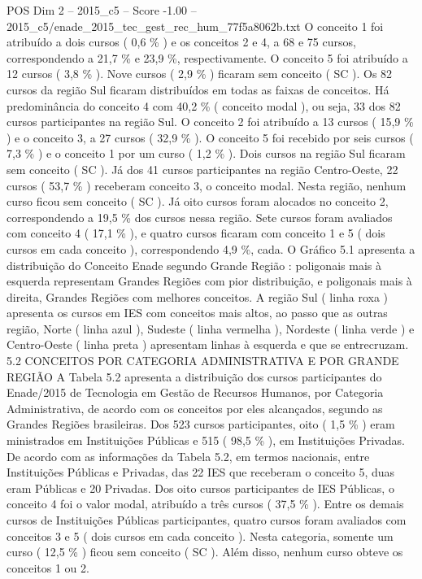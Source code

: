 \begin{textsample}{POS Dim 2 – 2015\_c5 – Score -1.00 – 2015\_c5/enade\_2015\_tec\_gest\_rec\_hum\_77f5a8062b.txt}
O conceito 1 foi atribuído a dois cursos ( 0,6 \% ) e os conceitos 2 e 4, a 68 e 75 cursos, correspondendo a 21,7 \% e 23,9 \%, respectivamente.
O conceito 5 foi atribuído a 12 cursos ( 3,8 \% ).
Nove cursos ( 2,9 \% ) ficaram sem conceito ( SC ).
Os 82 cursos da região Sul ficaram distribuídos em todas as faixas de conceitos.
Há predominância do conceito 4 com 40,2 \% ( conceito modal ), ou seja, 33 dos 82 cursos participantes na região Sul.
O conceito 2 foi atribuído a 13 cursos ( 15,9 \% ) e o conceito 3, a 27 cursos ( 32,9 \% ).
O conceito 5 foi recebido por seis cursos ( 7,3 \% ) e o conceito 1 por um curso ( 1,2 \% ).
Dois cursos na região Sul ficaram sem conceito ( SC ).
Já dos 41 cursos participantes na região Centro-Oeste, 22 cursos ( 53,7 \% ) receberam conceito 3, o conceito modal.
Nesta região, nenhum curso ficou sem conceito ( SC ).
Já oito cursos foram alocados no conceito 2, correspondendo a 19,5 \% dos cursos nessa região.
Sete cursos foram avaliados com conceito 4 ( 17,1 \% ), e quatro cursos ficaram com conceito 1 e 5 ( dois cursos em cada conceito ), correspondendo 4,9 \%, cada.
O Gráfico 5.1 apresenta a distribuição do Conceito Enade segundo Grande Região : poligonais mais à esquerda representam Grandes Regiões com pior distribuição, e poligonais mais à direita, Grandes Regiões com melhores conceitos.
A região Sul ( linha roxa ) apresenta os cursos em IES com conceitos mais altos, ao passo que as outras região, Norte ( linha azul ), Sudeste ( linha vermelha ), Nordeste ( linha verde ) e Centro-Oeste ( linha preta ) apresentam linhas à esquerda e que se entrecruzam. 5.2 CONCEITOS POR CATEGORIA ADMINISTRATIVA E POR GRANDE REGIÃO A Tabela 5.2 apresenta a distribuição dos cursos participantes do Enade/2015 de Tecnologia em Gestão de Recursos Humanos, por Categoria Administrativa, de acordo com os conceitos por eles alcançados, segundo as Grandes Regiões brasileiras.
Dos 523 cursos participantes, oito ( 1,5 \% ) eram ministrados em Instituições Públicas e 515 ( 98,5 \% ), em Instituições Privadas.
De acordo com as informações da Tabela 5.2, em termos nacionais, entre Instituições Públicas e Privadas, das 22 IES que receberam o conceito 5, duas eram Públicas e 20 Privadas.
Dos oito cursos participantes de IES Públicas, o conceito 4 foi o valor modal, atribuído a três cursos ( 37,5 \% ).
Entre os demais cursos de Instituições Públicas participantes, quatro cursos foram avaliados com conceitos 3 e 5 ( dois cursos em cada conceito ).
Nesta categoria, somente um curso ( 12,5 \% ) ficou sem conceito ( SC ).
Além disso, nenhum curso obteve os conceitos 1 ou 2.

\end{textsample}
